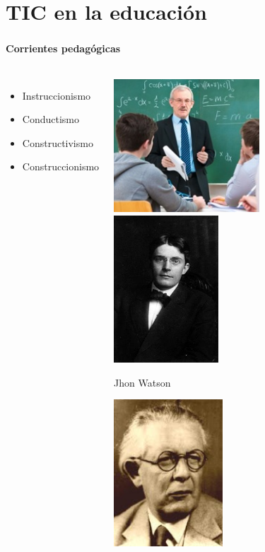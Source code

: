 \section{TIC en la educación}
\setcounter{sectiontotal}{3}

\begin{frame}[c]
    \frametitle{\pagetitle}
    \framesubtitle{Corrientes pedagógicas}

    \pause{}
\begin{columns}

 \hspace{0.5cm}
\begin{itemize}[<+->]
	\item Instruccionismo
	\item Conductismo
	\item Constructivismo
	\item Construccionismo
\end{itemize}

 \hspace{0.5cm}
\begin{overprint}
     \includegraphics[width=\textwidth, height=5cm]{imagenes/tradicional} 
     \includegraphics[width=\textwidth, height=5.5cm]{imagenes/conductismo} 
    
    \centering
    Jhon Watson
    
     \includegraphics[width=\textwidth, height=5.5cm]{imagenes/constructivismo} 


\end{overprint}
\end{columns}
\end{frame}
